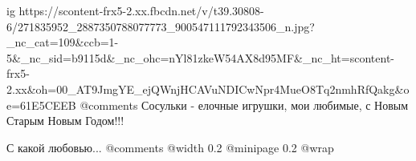  
 
 
 
 

\ifcmt
  ig https://scontent-frx5-2.xx.fbcdn.net/v/t39.30808-6/271835952_2887350788077773_900547111792343506_n.jpg?_nc_cat=109&ccb=1-5&_nc_sid=b9115d&_nc_ohc=nYl81zkeW54AX8d95MF&_nc_ht=scontent-frx5-2.xx&oh=00_AT9JmgYE_ejQWnjHCAVuNDICwNpr4MueO8Tq2nmhRfQakg&oe=61E5CEEB
	@comments%
Сосульки - елочные игрушки, мои любимые, с Новым Старым Новым Годом!!!

С какой любовью... 
	@comments%
  @width 0.2
  @minipage 0.2
  @wrap \parpic[r]
\fi
